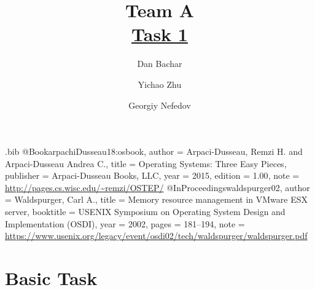 \usepackage{spverbatim}

\usepackage{filecontents}

\begin{filecontents}{\jobname.bib}
@Book{arpachiDusseau18:osbook,
  author =       {Arpaci-Dusseau, Remzi H. and Arpaci-Dusseau Andrea C.},
  title =        {Operating Systems: Three Easy Pieces},
  publisher =    {Arpaci-Dusseau Books, LLC},
  year =         2015,
  edition =      {1.00},
  note =         {\url{http://pages.cs.wisc.edu/~remzi/OSTEP/}}
}
@InProceedings{waldspurger02,
  author =       {Waldspurger, Carl A.},
  title =        {Memory resource management in {VMware ESX} server},
  booktitle =    {USENIX Symposium on Operating System Design and
                  Implementation (OSDI)},
  year =         2002,
  pages =        {181--194},
  note =         {\url{https://www.usenix.org/legacy/event/osdi02/tech/waldspurger/waldspurger.pdf}}}
\end{filecontents}



\date{}

\title{\Large \bf Team A\\  \href{https://github.com/danbachar/swiss-knife/tree/master/task1}{Task 1}}

\author{
{\rm Dan Bachar}
\and
{\rm Yichao Zhu}
\and
{\rm Georgiy Nefedov}
} %

\maketitle



\section{Basic Task}

